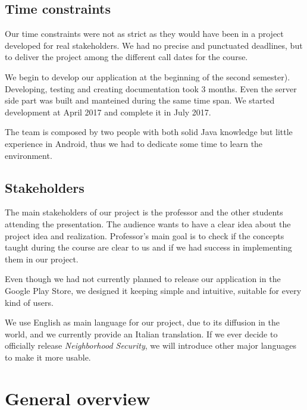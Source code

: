 \documentclass[a4paper]{scrreprt}
\begin{document}
\section{Time constraints}
Our time constraints were not as strict as they would have been in a project developed for real stakeholders. We had no precise and punctuated deadlines, but to deliver the project among the different call dates for the course.
\par We begin to develop our application at the beginning of the second semester). Developing, testing and creating documentation took 3 months. Even the server side part was built and manteined during the same time span. We started development at April 2017 and complete it in July 2017.
\par The team is composed by two people with both solid Java knowledge but little experience in Android, thus we had to dedicate some time to learn the environment.

\section{Stakeholders}
The main stakeholders of our project is the professor and the other students attending the presentation. The audience wants to have a clear idea about the project idea and realization. Professor's main goal is to check if the concepts taught during the course are clear to us and if we had success in implementing them in our project.
\par Even though we had not currently planned to release our application in the Google Play Store, we designed it keeping simple and intuitive, suitable for every kind of users.
\par We use English as main language for our project, due to its diffusion in the world, and we currently provide an Italian translation. If we ever decide to officially release \emph{Neighborhood Security}, we will introduce other major languages to make it more usable.

\chapter{General overview}
\end{document}
